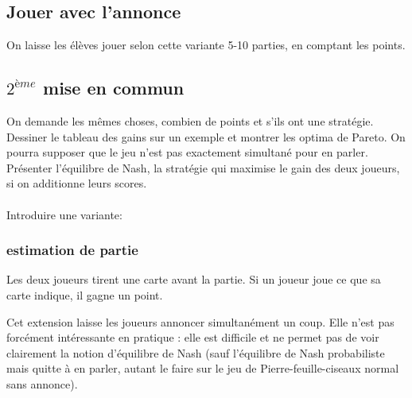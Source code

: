 \documentclass{article}
\begin{document}
\subsection{Jouer avec l'annonce}
On laisse les élèves jouer selon cette variante 5-10 parties, en comptant les points.

\subsection{$2^{ème}$ mise en commun}
On demande les mêmes choses, combien de points et s'ils ont une stratégie.\\
Dessiner le tableau des gains sur un exemple et montrer les optima de Pareto. On pourra supposer que le jeu n'est pas exactement simultané pour en parler. Présenter l'équilibre de Nash, la stratégie qui maximise le gain des deux joueurs, si on additionne leurs scores.
\\
\\
Introduire une variante: 
\subsubsection{estimation de partie}
    Les deux joueurs tirent une carte avant la partie. Si un joueur joue ce que sa carte indique, il gagne un point. 

    Cet extension laisse les joueurs annoncer simultanément un coup. Elle n'est pas forcément intéressante en pratique : elle est difficile et ne permet pas de voir clairement la notion d'équilibre de Nash (sauf l'équilibre de Nash probabiliste mais quitte à en parler, autant le faire sur le jeu de Pierre-feuille-ciseaux normal sans annonce).
\end{document}
